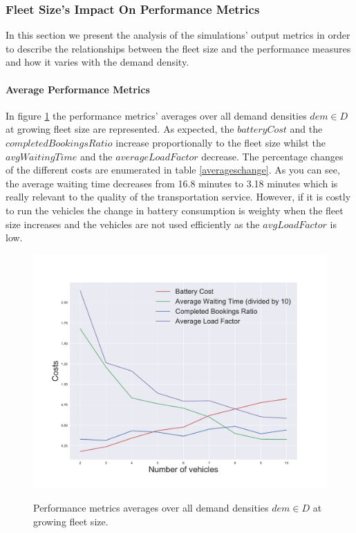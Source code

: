 \documentclass[12pt,a4paper]{article}
\begin{document}
\tiny{
}


\normalsize
\subsubsection{Fleet Size's Impact On Performance Metrics}\label{impact}
In this section we present the analysis of the simulations' output metrics in order to describe the relationships between the fleet size and the performance measures and how it varies with the demand density.

\paragraph{Average Performance Metrics} 
In figure \ref{averages} the performance metrics' averages over all demand densities $dem \in D$ at growing fleet size are represented. As expected, the $batteryCost$ and the $completedBookingsRatio$ increase proportionally to the fleet size whilst the $avgWaitingTime$ and the $averageLoadFactor$ decrease. The percentage changes of the different costs are enumerated in table \ref{averageschange}. As you can see, the average waiting time decreases from 16.8 minutes to 3.18 minutes which is really relevant to the quality of the transportation service. However, if it is costly to run the vehicles the change in battery consumption is weighty when the fleet size increases and the vehicles are not used efficiently as the $avgLoadFactor$ is low.

\begin{figure}[h] 
  \centering
  \caption{Performance metrics averages over all demand densities $dem \in D$ at growing fleet size.}
\includegraphics[scale=0.5]{./images/vehicleimpact.pdf}
\label{averages}
\end{figure}
\end{document}
